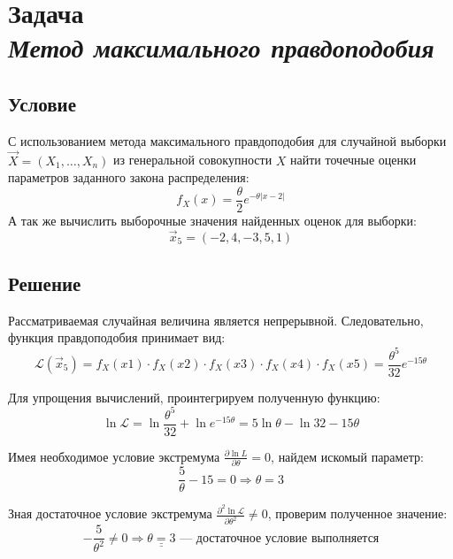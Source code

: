 \section*{Задача \\\textit{Метод максимального правдоподобия}}

\subsection*{Условие}
\sloppy С использованием метода максимального правдоподобия для случайной выборки $\vec{X} = (X_1,\dots,X_n)$ из генеральной совокупности $X$ найти точечные оценки параметров заданного закона распределения:
\begin{equation*}
    f_X(x) = \frac{\theta}{2} e^{-\theta |x - 2|}
\end{equation*}
А так же вычислить выборочные значения найденных оценок для выборки:
\begin{equation*}
    \vec{x}_5 = (-2, 4, -3, 5, 1)
\end{equation*}

\subsection*{Решение}
Рассматриваемая случайная величина является непрерывной. Следовательно, функция правдоподобия принимает вид:
\begin{equation*}
    \mathcal{L}(\vec{x}_5) = f_X(x1) \cdot f_X(x2) \cdot f_X(x3) \cdot f_X(x4) \cdot f_X(x5) = \frac{\theta^5}{32}e^{-15 \theta}
\end{equation*}

Для упрощения вычислений, проинтегрируем полученную функцию:
\begin{equation*}
    \ln \mathcal{L} = \ln\frac{\theta^5}{32} + \ln e^{-15 \theta} = 5 \ln \theta - \ln 32 - 15 \theta
\end{equation*}

Имея необходимое условие экстремума $\frac{\partial \ln L}{\partial \theta} = 0$, найдем искомый параметр:
\begin{equation*}
    \frac{5}{\theta} - 15 = 0 \Rightarrow \theta = 3
\end{equation*}

Зная достаточное условие экстремума $\frac{\partial^2 \ln \mathcal{L}}{\partial \theta^2} \neq 0$, проверим полученное значение:
\begin{equation*}
    -\frac{5}{\theta^2} \neq 0 \Rightarrow \underline{\underline{\theta = 3}} \text{~--- достаточное условие выполняется}
\end{equation*}

